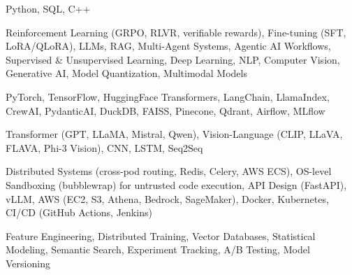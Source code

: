 \documentclass[letter,10pt]{article}
\begin{document}
 Python, SQL, C++\par\vspace{2pt}

 Reinforcement Learning (GRPO, RLVR, verifiable rewards), Fine-tuning (SFT, LoRA/QLoRA), LLMs, RAG, Multi-Agent Systems, Agentic AI Workflows, Supervised \& Unsupervised Learning, Deep Learning, NLP, Computer Vision, Generative AI, Model Quantization, Multimodal Models\par\vspace{2pt}

 PyTorch, TensorFlow, HuggingFace Transformers, LangChain, LlamaIndex, CrewAI, PydanticAI, DuckDB, FAISS, Pinecone, Qdrant, Airflow, MLflow\par\vspace{2pt}

 Transformer (GPT, LLaMA, Mistral, Qwen), Vision-Language (CLIP, LLaVA, FLAVA, Phi-3 Vision), CNN, LSTM, Seq2Seq\par\vspace{2pt}

 Distributed Systems (cross-pod routing, Redis, Celery, AWS ECS), OS-level Sandboxing (bubblewrap) for untrusted code execution, API Design (FastAPI), vLLM, AWS (EC2, S3, Athena, Bedrock, SageMaker), Docker, Kubernetes, CI/CD (GitHub Actions, Jenkins)\par\vspace{2pt}

 Feature Engineering, Distributed Training, Vector Databases, Statistical Modeling, Semantic Search, Experiment Tracking, A/B Testing, Model Versioning
\end{document}
